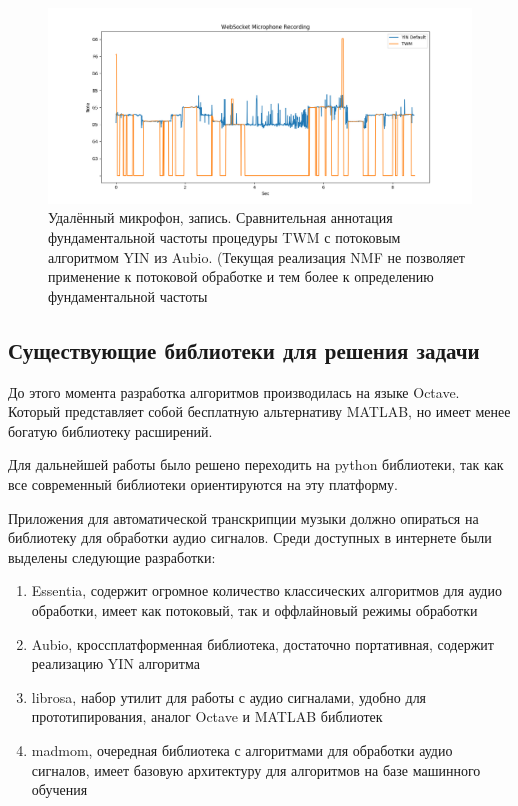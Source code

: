 \begin{figure}
  \centering
    \includegraphics[scale=.5]{res/record-twm-vs-yin.png}
  \centering
  \caption{Удалённый микрофон, запись.
    Сравнительная аннотация фундаментальной частоты процедуры
    TWM с потоковым алгоритмом YIN из Aubio.
    (Текущая реализация NMF не позволяет применение
    к потоковой обработке и тем более к определению фундаментальной
    частоты}
    \label{F:6-2-t-y-a-m}
\end{figure}

\subsection{Существующие библиотеки для решения задачи}

До этого момента разработка алгоритмов производилась на языке Octave.
Который представляет собой бесплатную альтернативу MATLAB, но имеет
менее богатую библиотеку расширений.

Для дальнейшей работы было решено переходить на python библиотеки,
так как все современный библиотеки ориентируются на эту платформу.

Приложения для автоматической транскрипции музыки должно опираться
на библиотеку для обработки аудио сигналов. Среди доступных в интернете
были выделены следующие разработки:
\begin{enumerate}
  \item Essentia, содержит огромное количество классических алгоритмов
    для аудио обработки, имеет как потоковый, так и оффлайновый режимы
    обработки
  \item Aubio, кроссплатформенная библиотека, достаточно портативная,
    содержит реализацию YIN алгоритма
  \item librosa, набор утилит для работы с аудио сигналами, удобно
    для прототипирования, аналог Octave и MATLAB библиотек
  \item madmom, очередная библиотека с алгоритмами для обработки
    аудио сигналов, имеет базовую архитектуру для алгоритмов на базе
    машинного обучения
\end{enumerate}

